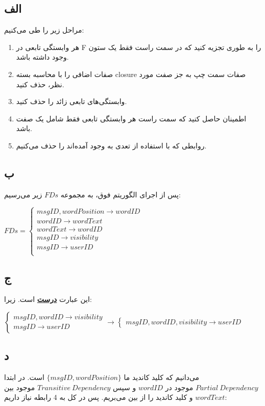 \subsection*{الف}
مراحل زیر را طی می‌کنیم:
\begin{enumerate}
	\item 
	هر وابستگی تابعی در F را به طوری تجزیه کنید که در سمت راست فقط یک ستون وجود داشته باشد.
	\item 
صفات اضافی را با محاسبه بسته closure صفات سمت چپ به جز صفت مورد نظر، حذف کنید.
\item 
وابستگی‌های تابعی زائد را حذف کنید.
\item
اطمینان حاصل کنید که سمت راست هر وابستگی تابعی فقط شامل یک صفت باشد.
\item 
روابطی که با استفاده از تعدی به وجود آمده‌اند را حذف می‌کنیم.
\end{enumerate}

\subsection*{ب}

پس از اجرای الگوریتم فوق، به مجموعه $FDs$ زیر می‌رسیم:

\setLTR
$
FDs = \begin{cases}
msgID,wordPosition \rightarrow wordID \\
wordID \rightarrow wordText \\
wordText \rightarrow wordID \\
msgID \rightarrow  visibility\\
msgID \rightarrow  userID\\
\end{cases}
$
\setRTL


\subsection*{ج}
این عبارت 
\underline{\textbf{درست}}
است. زیرا:

\setLTR
$
\begin{cases}
	msgID,wordID \rightarrow visibility \\
	msgID \rightarrow userID
\end{cases} \longrightarrow 
\begin{cases}
	msgID,wordID,visibility \rightarrow userID
\end{cases}
$
\setRTL


\subsection*{د}
می‌دانیم که کلید کاندید ما 
$\{msgID,wordPosition\}$
است. در ابتدا 
$Partial \ Dependency$
موجود در $wordID$ و سپس 
$Transitive \ Dependency$
موجود بین 
$wordText$
و کلید کاندید را از بین می‌بریم. پس در کل به 4 رابطه نیاز داریم:

